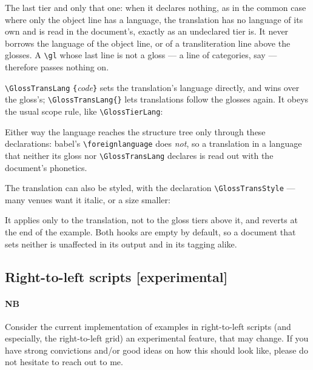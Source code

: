 \documentclass[11pt,a4paper]{article}
\newcommand{\cs}[1]{\texttt{\textbackslash #1}}
\newcommand{\pkg}[2][]{\textsf{#2}}
\newcommand{\meta}[1]{\textrm{\itshape\textlangle#1\textrangle}}
\newcommand{\marg}[1]{\penalty300 \texttt{\{}\meta{#1}\texttt{\}}}
\begin{document}
\noindent The last tier and only that one: when it declares nothing, as in
the common case where only the object line has a language, the translation
has no language of its own and is read in the document's, exactly as an
undeclared tier is. It never borrows the language of the object line, or of
a transliteration line above the glosses. A \cs{gl} whose last line is not
a gloss --- a line of categories, say --- therefore passes nothing on.

\cs{GlossTransLang}\marg{code} sets the translation's language directly, and
wins over the gloss's; \verb|\GlossTransLang{}| lets translations follow the
glosses again. It obeys the usual scope rule, like \cs{GlossTierLang}:

\begin{code}
\end{code}

\noindent Either way the language reaches the structure tree only through
these declarations: \pkg{babel}'s \cs{foreignlanguage} does \emph{not}, so
a translation in a language that neither its gloss nor
\cs{GlossTransLang} declares is read out with the document's phonetics.

The translation can also be styled, with the declaration
\cs{GlossTransStyle} --- many venues want it italic, or a size smaller:

\begin{code}
\renewcommand\GlossTransStyle{\itshape}
\end{code}

\noindent It applies only to the translation, not to the gloss tiers above
it, and reverts at the end of the example. Both hooks are empty by default,
so a document that sets neither is unaffected in its output and in its
tagging alike.


\subsection{Right-to-left scripts [experimental]}\label{sec:rtl}

\paragraph{NB} Consider the current implementation of examples in
right-to-left scripts (and especially, the right-to-left grid) an
experimental feature, that may change. If you have strong convictions
and/or good ideas on how this should look like, please do not hesitate
to reach out to me. 
\end{document}
